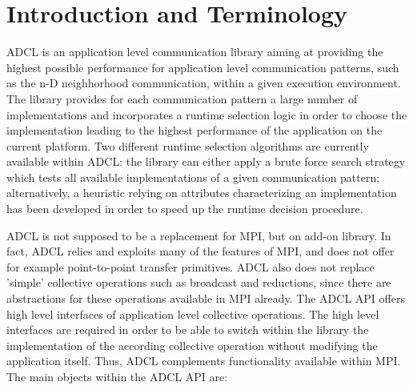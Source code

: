 \section{Introduction and Terminology}

ADCL is an application level communication library aiming at providing the highest possible performance for application level communication patterns, such as the n-D neighhorhood communication, within a given execution environment. The library provides for each communication pattern a large number of implementations and incorporates a runtime selection logic in order to choose the implementation leading to the highest performance of the application on the current platform. Two different runtime selection algorithms are currently available within ADCL: the library can either apply a brute force search strategy which tests all available implementations of a given communication pattern; alternatively, a heuristic relying on attributes characterizing an implementation has been developed in order to speed up the runtime decision procedure.

ADCL is not supposed to be a replacement for MPI, but on add-on library. In fact, ADCL relies and exploits many of the features of MPI, and does not offer for example point-to-point transfer primitives. ADCL also does not replace 'simple' collective operations such as broadcast and reductions, since there are abstractions for these operations available in MPI already.
The ADCL API offers high level interfaces of application level collective operations. The high level interfaces are required in order to be able to switch within the library the implementation of the according collective operation without modifying the application itself. Thus, ADCL complements functionality available within MPI. The main objects within the ADCL API are:

